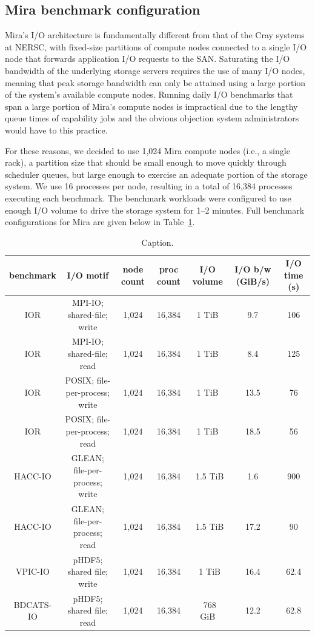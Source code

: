 \documentclass[conference,10pt,compsocconf]{IEEEtran}
\begin{document}
\subsection{Mira benchmark configuration}

Mira's I/O architecture is fundamentally different from that of the Cray
systems at NERSC, with fixed-size partitions of compute nodes connected to
a single I/O node that forwards application I/O requests to the SAN.
Saturating the I/O bandwidth of the underlying storage servers requires the
use of many I/O nodes, meaning that peak storage bandwidth can only be
attained using a large portion of the system's available compute nodes.
Running daily I/O benchmarks that span a large portion of Mira's compute
nodes is impractical due to the lengthy queue times of capability jobs and
the obvious objection system administrators would have to this practice.

For these reasons, we decided to use 1,024 Mira compute nodes (i.e., a single
rack), a partition size that should be small enough to move quickly through
scheduler queues, but large enough to exercise an adequate portion of the
storage system. We use 16 processes per node, resulting in a total of 16,384
processes executing each benchmark. The benchmark workloads were configured
to use enough I/O volume to drive the storage system for 1--2 minutes.
Full benchmark configurations for Mira are given below in
Table~\ref{tab:mira-bench-config}.

\begin{table}[h]
\centering
\begin{tabular}{|c|c|c|c|c|c|c|}
\hline
benchmark & I/O motif & node count & proc count & I/O volume & I/O b/w (GiB/s) & I/O time (s) \\
\hline
IOR & MPI-IO; shared-file; write & 1,024 & 16,384 & 1 TiB & 9.7 & 106 \\
\hline
IOR & MPI-IO; shared-file; read & 1,024 & 16,384 & 1 TiB & 8.4 & 125 \\
\hline
IOR & POSIX; file-per-process; write & 1,024 & 16,384 & 1 TiB & 13.5 & 76 \\
\hline
IOR & POSIX; file-per-process; read & 1,024 & 16,384 & 1 TiB & 18.5 & 56 \\
\hline
HACC-IO & GLEAN; file-per-process; write & 1,024 & 16,384 & ~1.5 TiB & 1.6 & 900 \\
\hline
HACC-IO & GLEAN; file-per-process; read & 1,024 & 16,384 & ~1.5 TiB & 17.2 & 90 \\
\hline
VPIC-IO & pHDF5; shared file; write & 1,024 & 16,384 & ~1 TiB & 16.4 & 62.4 \\
\hline
BDCATS-IO & pHDF5; shared file; read & 1,024 & 16,384 & ~768 GiB & 12.2 & 62.8 \\
\hline
\end{tabular}
\caption{Caption.}
\label{tab:mira-bench-config}
\end{table}
\end{document}
